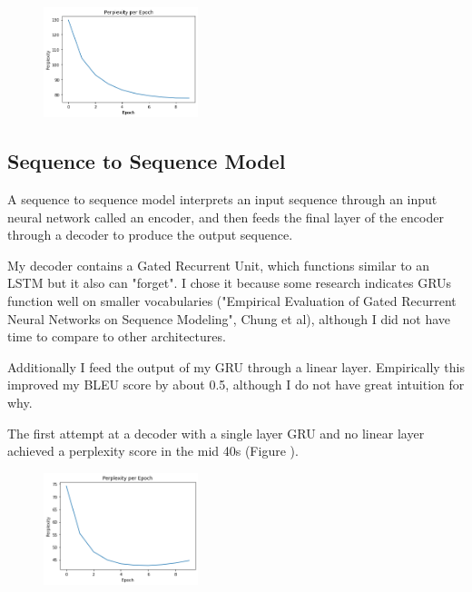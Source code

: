 \begin{figure}[h]
    \centering
    \includegraphics[width=0.4\textwidth]{resources/png/LSTM_05e3.png}
    \label{secondtry}
\end{figure}

\subsection*{Sequence to Sequence Model}
A sequence to sequence model interprets an input sequence through an input neural network called an encoder, and then feeds the final layer of the encoder through a decoder to produce the output sequence. 

My decoder contains a Gated Recurrent Unit, which functions similar to an LSTM but it also can "forget". I chose it because some research indicates GRUs function well on smaller vocabularies ("Empirical Evaluation of Gated Recurrent Neural Networks on Sequence Modeling", Chung et al), although I did not have time to compare to other architectures. 

Additionally I feed the output of my GRU through a linear layer. Empirically this improved my BLEU score by about 0.5, although I do not have great intuition for why. 

The first attempt at a decoder with a single layer GRU and no linear layer achieved a perplexity score in the mid 40s (Figure \label{seq1}).

\begin{figure}[h]
    \centering
    \includegraphics[width=0.4\textwidth]{resources/png/seq2seq1layer.png}
    \label{seq1}
\end{figure}

